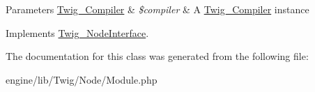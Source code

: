 \begin{DoxyParams}[1]{Parameters}
\hyperlink{class_twig___compiler}{Twig\+\_\+\+Compiler} & {\em \$compiler} & A \hyperlink{class_twig___compiler}{Twig\+\_\+\+Compiler} instance \\
\hline
\end{DoxyParams}


Implements \hyperlink{interface_twig___node_interface_a4e0faa87c3fae583620b84d3607085da}{Twig\+\_\+\+Node\+Interface}.



The documentation for this class was generated from the following file\+:\begin{DoxyCompactItemize}
\item 
engine/lib/\+Twig/\+Node/Module.\+php\end{DoxyCompactItemize}
